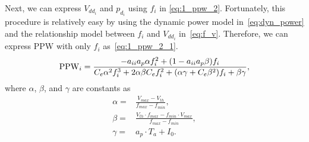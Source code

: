 Next, we can express $V_{dd_i}$ and $p_{d_i}$ using $f_{i}$ in \eqref{eq:1_ppw_2}. Fortunately, this procedure is relatively easy by
using the dynamic power model in~\eqref{eq:dyn_power} and the
relationship model between $f_i$ and $V_{dd_i}$
in~\eqref{eq:f_v}. Therefore, we can express PPW with only $f_{i}$ as~\eqref{eq:1_ppw_2_1}.
\begin{equation}\label{eq:1_ppw_2_1}
\ppw_i =\frac{-a_{ii}a_{p}\alpha
  f_{i}^{2}+(1-a_{ii}a_{p}\beta)f_{i}}{C_{e}\alpha^{2}f_{i}^{3}+2\alpha
  \beta C_{e}f_{i}^{2}+(\alpha \gamma+C_{e}\beta^{2})f_{i}+\beta \gamma},
\end{equation}
where $\alpha$, $\beta$, and $\gamma$ are constants as
\begin{equation*}
	\begin{split}
	\alpha=&\frac{V_{max}-V_{th}}{f_{max}-f_{min}},\\
	\beta=&\frac{V_{th}\cdot f_{max}-f_{min}\cdot V_{max}}{f_{max}-f_{min}},\\
	\gamma=&a_{p}\cdot T_{a}+I_{0}.
	\end{split}
\end{equation*}


